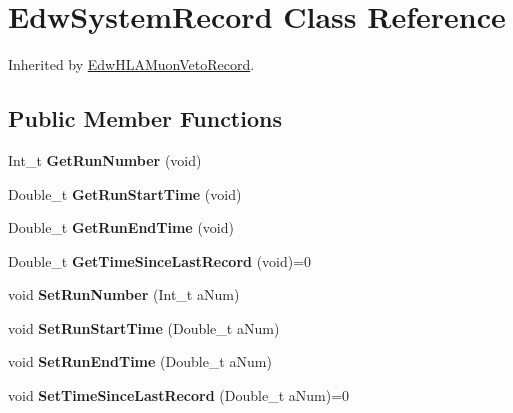 \hypertarget{class_edw_system_record}{
\section{EdwSystemRecord Class Reference}
\label{class_edw_system_record}
}


Inherited by \hyperlink{class_edw_h_l_a_muon_veto_record}{EdwHLAMuonVetoRecord}.

\subsection*{Public Member Functions}
\begin{DoxyCompactItemize}
\item 
\hypertarget{class_edw_system_record_a13cb3d302445139a030f9ab589a6e76f}{
Int\_\-t {\bfseries GetRunNumber} (void)}
\label{class_edw_system_record_a13cb3d302445139a030f9ab589a6e76f}

\item 
\hypertarget{class_edw_system_record_a461c258fe176f641543cda6c13ed0d6c}{
Double\_\-t {\bfseries GetRunStartTime} (void)}
\label{class_edw_system_record_a461c258fe176f641543cda6c13ed0d6c}

\item 
\hypertarget{class_edw_system_record_a53ba51e04f6560fd28aaaa99afcb3a31}{
Double\_\-t {\bfseries GetRunEndTime} (void)}
\label{class_edw_system_record_a53ba51e04f6560fd28aaaa99afcb3a31}

\item 
\hypertarget{class_edw_system_record_a7d0eeff6127b9120d33f6d18c849ffa3}{
Double\_\-t {\bfseries GetTimeSinceLastRecord} (void)=0}
\label{class_edw_system_record_a7d0eeff6127b9120d33f6d18c849ffa3}

\item 
\hypertarget{class_edw_system_record_a588fe48694677e90d687de193711e5ae}{
void {\bfseries SetRunNumber} (Int\_\-t aNum)}
\label{class_edw_system_record_a588fe48694677e90d687de193711e5ae}

\item 
\hypertarget{class_edw_system_record_a3b2058a0639379c4187f7226d098d735}{
void {\bfseries SetRunStartTime} (Double\_\-t aNum)}
\label{class_edw_system_record_a3b2058a0639379c4187f7226d098d735}

\item 
\hypertarget{class_edw_system_record_a70149ce755268b90f0c3137cc8648dfe}{
void {\bfseries SetRunEndTime} (Double\_\-t aNum)}
\label{class_edw_system_record_a70149ce755268b90f0c3137cc8648dfe}

\item 
\hypertarget{class_edw_system_record_aba5eab9d2db56973cf95e9782753f84d}{
void {\bfseries SetTimeSinceLastRecord} (Double\_\-t aNum)=0}
\label{class_edw_system_record_aba5eab9d2db56973cf95e9782753f84d}

\end{DoxyCompactItemize}


